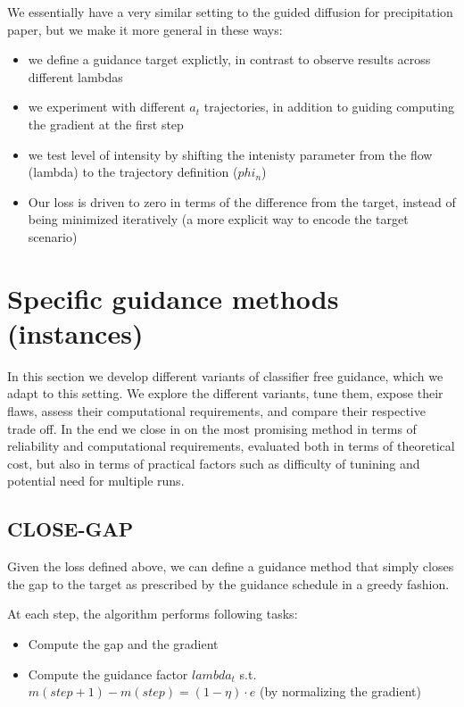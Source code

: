 We essentially have a very similar setting to the guided diffusion for precipitation paper, but we make it more general in these ways:
\begin{itemize}[noitemsep]
    \item we define a guidance target explictly, in contrast to observe results across different lambdas
    \item we experiment with different $a_t$ trajectories, in addition to guiding computing the gradient at the first step
    \item we test level of intensity by shifting the intenisty parameter from the flow (lambda) to the trajectory definition ($phi_n$)
    \item Our loss is driven to zero in terms of the difference from the target, instead of being minimized iteratively (a more explicit way to encode the target scenario)
\end{itemize}

\section{Specific guidance methods (instances)}

In this section we develop different variants of classifier free guidance, which we adapt to this setting.
We explore the different variants, tune them, expose their flaws, assess their computational requirements, and compare their respective trade off.
In the end we close in on the most promising method in terms of reliability and computational requirements, 
evaluated both in terms of theoretical cost, but also in terms of practical factors such as difficulty of tunining and potential need for multiple runs.

\subsection{CLOSE-GAP}

Given the loss defined above, we can define a guidance method that simply closes the gap to the target as prescribed by the guidance schedule in a greedy fashion.

At each step, the algorithm performs following tasks: 
\begin{itemize}
    \item Compute the gap and the gradient
    \item Compute the guidance factor $lambda_t$ s.t. $m(step+1) - m(step) = (1-\eta) \cdot e$ (by normalizing the gradient)
\end{itemize}

